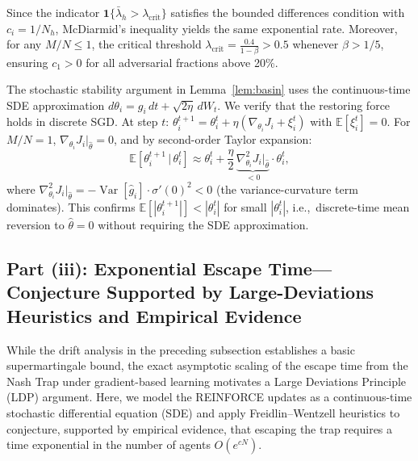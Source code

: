 \begin{corollary}
\label{cor:mcdiarmid}
Since the indicator $\mathbf{1}\{\bar{\lambda}_h > \lambda_{\mathrm{crit}}\}$
satisfies the bounded differences condition with $c_i = 1/N_h$,
McDiarmid's inequality yields the same exponential rate.
Moreover, for any $M/N \leq 1$, the critical threshold
$\lambda_{\mathrm{crit}} = \frac{0.4}{1-\beta} > 0.5$
whenever $\beta > 1/5$, ensuring $c_1 > 0$ for all
adversarial fractions above 20\%.
\end{corollary}


\begin{remark}
\label{rem:discrete_time}
The stochastic stability argument in Lemma~\ref{lem:basin} uses the
continuous-time SDE approximation
$d\theta_i = g_i \, dt + \sqrt{2\eta} \, dW_t$.
We verify that the restoring force holds in discrete SGD.
At step $t$:
$\theta_i^{t+1} = \theta_i^t + \eta (\nabla_{\theta_i} J_i + \xi_i^t)$
with $\mathbb{E}[\xi_i^t] = 0$.
For $M/N = 1$, $\nabla_{\theta_i} J_i|_{\hat\theta} = 0$, and by
second-order Taylor expansion:
\[
  \mathbb{E}[\theta_i^{t+1} \,|\, \theta_i^t]
  \approx \theta_i^t + \frac{\eta}{2}\,
  \underbrace{\nabla^2_{\theta_i} J_i\big|_{\hat\theta}}_{\displaystyle < 0}
  \cdot \theta_i^t,
\]
where $\nabla^2_{\theta_i} J_i|_{\hat\theta}
= -\operatorname{Var}[\hat{g}_i] \cdot \sigma'(0)^2 < 0$
(the variance-curvature term dominates).
This confirms $\mathbb{E}[|\theta_i^{t+1}|] < |\theta_i^t|$
for small $|\theta_i^t|$, i.e.,\ discrete-time mean reversion
to $\hat\theta = 0$ without requiring the SDE approximation.
\end{remark}

\subsection{Part (iii): Exponential Escape Time---Conjecture Supported by Large-Deviations Heuristics and Empirical Evidence}

While the drift analysis in the preceding subsection establishes a basic supermartingale bound, the exact asymptotic scaling of the escape time from the Nash Trap under gradient-based learning motivates a Large Deviations Principle (LDP) argument. Here, we model the REINFORCE updates as a continuous-time stochastic differential equation (SDE) and apply Freidlin--Wentzell heuristics to conjecture, supported by empirical evidence, that escaping the trap requires a time exponential in the number of agents $O(e^{cN})$.


